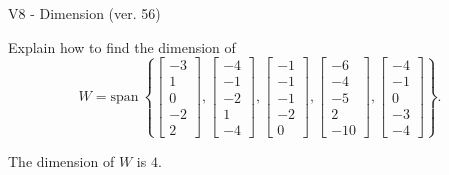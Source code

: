 \begin{exercise}
  \begin{exerciseTitle}V8 - Dimension (ver. 56)\end{exerciseTitle}
  \begin{exerciseStatement}
    Explain how to find the dimension of 
\[W=\mathrm{span}\ \left\{\left[\begin{array}{r}
-3 \\
1 \\
0 \\
-2 \\
2
\end{array}\right] , \left[\begin{array}{r}
-4 \\
-1 \\
-2 \\
1 \\
-4
\end{array}\right] , \left[\begin{array}{r}
-1 \\
-1 \\
-1 \\
-2 \\
0
\end{array}\right] , \left[\begin{array}{r}
-6 \\
-4 \\
-5 \\
2 \\
-10
\end{array}\right] , \left[\begin{array}{r}
-4 \\
-1 \\
0 \\
-3 \\
-4
\end{array}\right]\right\}.\]



  \end{exerciseStatement}
  \begin{exerciseAnswer}
   The dimension of \(W\) is  \(4\).
  


  \end{exerciseAnswer}
\end{exercise}